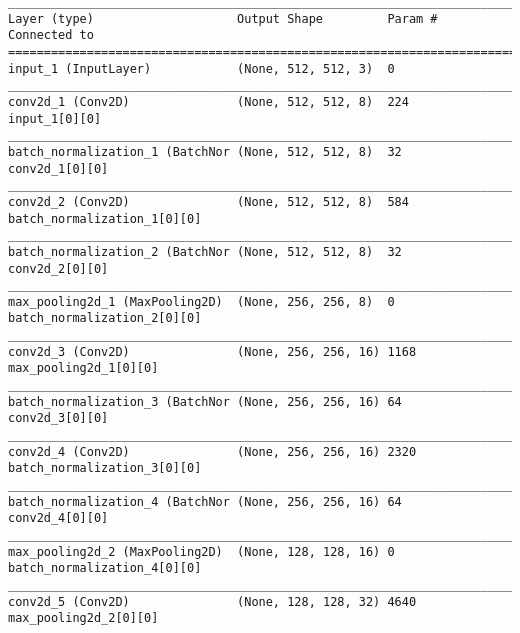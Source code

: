 \begin{verbatim}
__________________________________________________________________________________________________
Layer (type)                    Output Shape         Param #     Connected to                     
==================================================================================================
input_1 (InputLayer)            (None, 512, 512, 3)  0                                            
__________________________________________________________________________________________________
conv2d_1 (Conv2D)               (None, 512, 512, 8)  224         input_1[0][0]                    
__________________________________________________________________________________________________
batch_normalization_1 (BatchNor (None, 512, 512, 8)  32          conv2d_1[0][0]                   
__________________________________________________________________________________________________
conv2d_2 (Conv2D)               (None, 512, 512, 8)  584         batch_normalization_1[0][0]      
__________________________________________________________________________________________________
batch_normalization_2 (BatchNor (None, 512, 512, 8)  32          conv2d_2[0][0]                   
__________________________________________________________________________________________________
max_pooling2d_1 (MaxPooling2D)  (None, 256, 256, 8)  0           batch_normalization_2[0][0]      
__________________________________________________________________________________________________
conv2d_3 (Conv2D)               (None, 256, 256, 16) 1168        max_pooling2d_1[0][0]            
__________________________________________________________________________________________________
batch_normalization_3 (BatchNor (None, 256, 256, 16) 64          conv2d_3[0][0]                   
__________________________________________________________________________________________________
conv2d_4 (Conv2D)               (None, 256, 256, 16) 2320        batch_normalization_3[0][0]      
__________________________________________________________________________________________________
batch_normalization_4 (BatchNor (None, 256, 256, 16) 64          conv2d_4[0][0]                   
__________________________________________________________________________________________________
max_pooling2d_2 (MaxPooling2D)  (None, 128, 128, 16) 0           batch_normalization_4[0][0]      
__________________________________________________________________________________________________
conv2d_5 (Conv2D)               (None, 128, 128, 32) 4640        max_pooling2d_2[0][0]            

\end{verbatim}
